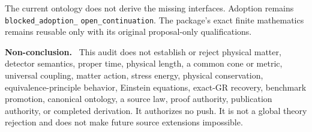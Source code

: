 \documentclass[11pt]{article}
\newenvironment{nonconclusion}{\par\smallskip\noindent\textbf{Non-conclusion.}\ }{\par\smallskip}
\begin{document}
The current ontology does not derive the missing interfaces. Adoption remains
\texttt{blocked\_adoption\_}\allowbreak
\texttt{open\_continuation}. The package's exact finite mathematics remains
reusable only with its original proposal-only qualifications.

\begin{nonconclusion}
This audit does not establish or reject physical matter, detector semantics,
proper time, physical length, a common cone or metric, universal coupling,
matter action, stress energy, physical conservation, equivalence-principle
behavior, Einstein equations, exact-GR recovery, benchmark promotion,
canonical ontology, a source law, proof authority, publication authority, or
completed derivation. It authorizes no push. It is not a global theory
rejection and does not make future source extensions impossible.
\end{nonconclusion}
\end{document}
